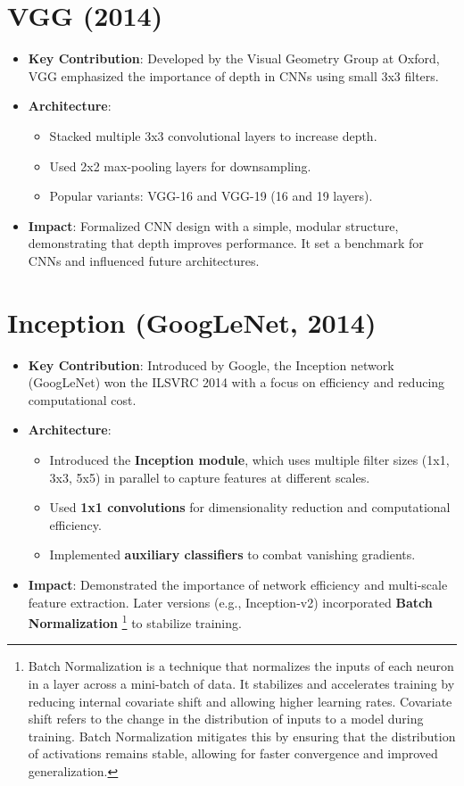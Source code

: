 \begin{notechapter}
\section{VGG (2014)}
\begin{itemize}
  \item \textbf{Key Contribution}: Developed by the Visual Geometry 
    Group at Oxford, VGG emphasized the importance of depth in CNNs 
    using small 3x3 filters.
  \item \textbf{Architecture}:
    \begin{itemize}
      \item Stacked multiple 3x3 convolutional layers to increase 
        depth.
      \item Used 2x2 max-pooling layers for downsampling.
      \item Popular variants: VGG-16 and VGG-19 (16 and 19 layers).
    \end{itemize}
  \item \textbf{Impact}: Formalized CNN design with a simple, modular 
    structure, demonstrating that depth improves performance. It set a 
    benchmark for CNNs and influenced future architectures.
\end{itemize}

\section{Inception (GoogLeNet, 2014)}
\begin{itemize}
  \item \textbf{Key Contribution}: Introduced by Google, the Inception 
    network (GoogLeNet) won the ILSVRC 2014 with a focus on efficiency 
    and reducing computational cost.
  \item \textbf{Architecture}:
    \begin{itemize}
      \item Introduced the \textbf{Inception module}, which uses 
        multiple filter sizes (1x1, 3x3, 5x5) in parallel to capture 
        features at different scales.
      \item Used \textbf{1x1 convolutions} for dimensionality reduction 
        and computational efficiency.
      \item Implemented \textbf{auxiliary classifiers} to combat 
        vanishing gradients.
    \end{itemize}
  \item \textbf{Impact}: Demonstrated the importance of network 
    efficiency and multi-scale feature extraction. Later versions 
    (e.g., Inception-v2) incorporated \textbf{Batch Normalization}
    \footnote{Batch Normalization is a technique that normalizes the 
    inputs of each neuron in a layer across a mini-batch of data. It 
    stabilizes and accelerates training by reducing internal covariate 
    shift and allowing higher learning rates. Covariate shift refers 
    to the change in the distribution of inputs to a model during 
    training. Batch Normalization mitigates this by ensuring that the 
    distribution of activations remains stable, allowing for faster 
    convergence and improved generalization.} to stabilize training.
\end{itemize}


\end{notechapter}
